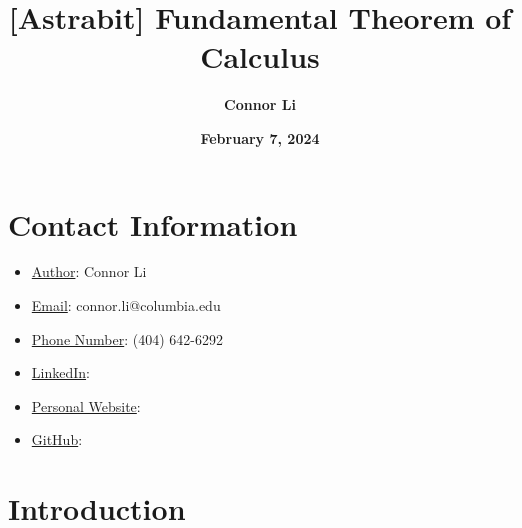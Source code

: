 \documentclass[8pt]{extarticle}
\title{\textbf{[Astrabit] Fundamental Theorem of Calculus}}
\author{\textbf{Connor Li}}
\date{\textbf{February 7, 2024}}
\begin{document}
\maketitle


\section*{Contact Information}
\begin{itemize}
    \item \underline{Author}: Connor Li
    \item \underline{Email}: connor.li@columbia.edu
    \item \underline{Phone Number}: (404) 642-6292
    \item \underline{LinkedIn}: 
    \item \underline{Personal Website}:
    \item \underline{GitHub}: 
\end{itemize}

\tableofcontents

\pagebreak
\section{Introduction}
\end{document}
